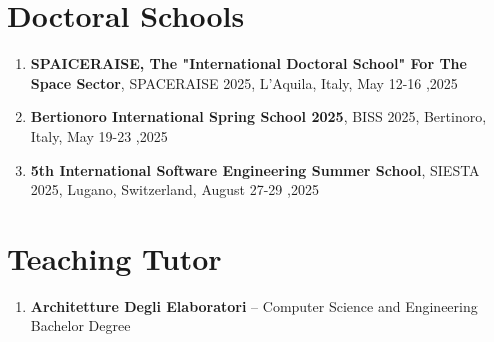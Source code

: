 \documentclass[runningheads]{llncs}
\begin{document}
{{%

    \section{Doctoral Schools}\label{sec:doctoral-schools}
    \begin{enumerate}
        \item \textbf{SPAICERAISE, The "International Doctoral School" For The Space Sector}, SPACERAISE 2025, L'Aquila, Italy, May 12-16 ,2025
        \item \textbf{Bertionoro International Spring School 2025}, BISS 2025, Bertinoro, Italy, May 19-23 ,2025
        \item \textbf{5th International Software Engineering Summer School}, SIESTA 2025, Lugano, Switzerland, August 27-29 ,2025
    \end{enumerate}

    \section{Teaching Tutor}
    \begin{enumerate}
        \item \textbf{Architetture Degli Elaboratori} -- Computer Science and Engineering Bachelor Degree
    \end{enumerate}

}}
\end{document}
